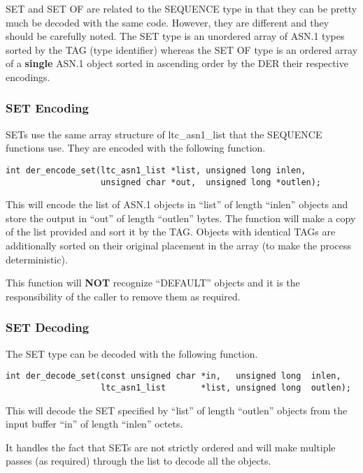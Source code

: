 \documentclass[a4paper]{book}
\begin{document}
 
SET and SET OF are related to the SEQUENCE type in that they can be pretty much be decoded with the same code.  However, they are different and they should
be carefully noted.  The SET type is an unordered array of ASN.1 types sorted by the TAG (type identifier) whereas the SET OF type is an ordered array of 
a \textbf{single} ASN.1 object sorted in ascending order by the DER their respective encodings.

\subsubsection{SET Encoding}

SETs use the same array structure of ltc\_asn1\_list that the SEQUENCE functions use.  They are encoded with the following function.

\begin{verbatim}
int der_encode_set(ltc_asn1_list *list, unsigned long inlen,
                   unsigned char *out,  unsigned long *outlen);
\end{verbatim}            

This will encode the list of ASN.1 objects in ``list'' of length ``inlen'' objects and store the output in ``out'' of length ``outlen'' bytes.  The function
will make a copy of the list provided and sort it by the TAG.  Objects with identical TAGs are additionally sorted on their original placement in the 
array (to make the process deterministic).

This function will \textbf{NOT} recognize ``DEFAULT'' objects and it is the responsibility of the caller to remove them as required.

\subsubsection{SET Decoding}

The SET type can be decoded with the following function.

\begin{verbatim}
int der_decode_set(const unsigned char *in,   unsigned long  inlen,
                   ltc_asn1_list       *list, unsigned long  outlen);
\end{verbatim}

This will decode the SET specified by ``list'' of length ``outlen'' objects from the input buffer ``in'' of length ``inlen'' octets.

It handles the fact that SETs are not strictly ordered and will make multiple passes (as required) through the list to decode all the objects.  
\end{document}
